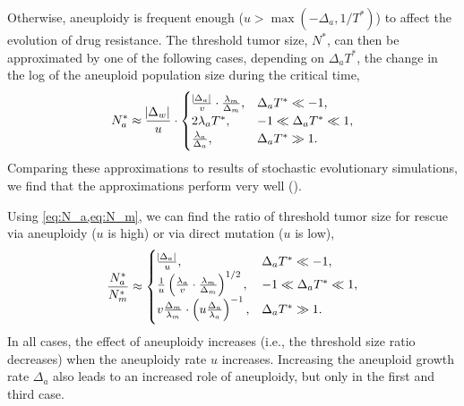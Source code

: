\documentclass[12pt]{extarticle}
\begin{document}
Otherwise, aneuploidy is frequent enough ($u > \max{(-\Delta_a, 1/T^*)}$) to affect the evolution of drug resistance. 
The threshold tumor size, $N^*$, can then be approximated by one of the following cases, depending on $\Delta_a T^*$, the change in the log of the aneuploid population size during the critical time,
\begin{equation}  \label{eq:N_a}
\begin{aligned}
N_a^* \approx 
  \frac{\abs{\Delta_w}}{u} \cdot \begin{cases}
    \frac{\abs{\Delta_a}}{v} \cdot \frac{\lambda_m}{\Delta_m} ,&
  \Delta_a T^* \ll -1 ,\\ 
  2\lambda_a T^* ,&
  -1 \ll \Delta_a T^* \ll 1  ,\\ 
  \frac{\lambda_a}{\Delta_a} ,&
   \Delta_a T^* \gg 1 .
  \end{cases}
\end{aligned}
\end{equation}
Comparing these approximations to results of stochastic evolutionary simulations, we find that the approximations perform very well ().

Using \cref{eq:N_a,eq:N_m}, we can find the ratio of threshold tumor size for rescue via aneuploidy ($u$ is high) or via direct mutation ($u$ is low),
\begin{equation} \label{eq:N_ratio}
\frac{N^*_a}{N^*_m} \approx \begin{cases}
    \frac{\abs{\Delta_a}}{u} ,&
  \Delta_a T^* \ll -1 ,\\ 
  \frac{1}{u}\left(\frac{\lambda_a}{v} \cdot \frac{\lambda_m}{\Delta_m}\right)^{1/2} ,&
  -1 \ll \Delta_a T^* \ll 1  ,\\ 
  v \frac{\Delta_m}{\lambda_m} \cdot \left(u \frac{\Delta_a}{\lambda_a}\right)^{-1}  ,&
   \Delta_a T^* \gg 1 .
  \end{cases}
\end{equation}
In all cases, the effect of aneuploidy increases (i.e., the threshold size ratio decreases) when the aneuploidy rate $u$ increases. Increasing the aneuploid growth rate $\Delta_a$ also leads to an increased role of aneuploidy, but only in the first and third case.
\end{document}
